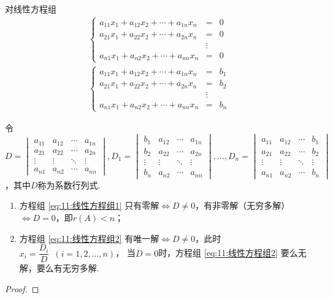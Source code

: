 \begin{theorem}  \label{thm:13:Cramer}
    对线性方程组
    \begin{gather}
        \label{eq:11:线性方程组1}
        \left\{ \begin{array}{rcl}
            a_{11}x_1+a_{12}x_2+\cdots+a_{1n}x_n&=&0 \\
            a_{21}x_1+a_{22}x_2+\cdots+a_{2n}x_n&=&0 \\
            &\vdots& \\
            a_{n1}x_1+a_{n2}x_2+\cdots+a_{nn}x_n&=&0
        \end{array} \right.
        \\
        \label{eq:11:线性方程组2}
        \left\{ \begin{array}{rcl}
            a_{11}x_1+a_{12}x_2+\cdots+a_{1n}x_n&=&b_1 \\
            a_{21}x_1+a_{22}x_2+\cdots+a_{2n}x_n&=&b_2 \\
            &\vdots& \\
            a_{n1}x_1+a_{n2}x_2+\cdots+a_{nn}x_n&=&b_n
        \end{array} \right.
    \end{gather}

    令$D=\begin{vmatrix}
        a_{11} & a_{12} & \cdots & a_{1n} \\
        a_{21} & a_{22} & \cdots & a_{2n} \\
        \vdots & \vdots & \ddots & \vdots \\
        a_{n1} & a_{n2} & \cdots & a_{nn}
    \end{vmatrix},D_1=\begin{vmatrix}
        b_1 & a_{12} & \cdots & a_{1n} \\
        b_2 & a_{22} & \cdots & a_{2n} \\
        \vdots & \vdots & \ddots & \vdots \\
        b_n & a_{n2} & \cdots & a_{nn}
    \end{vmatrix},\ldots,D_n=\begin{vmatrix}
        a_{11} & a_{12} & \cdots & b_1 \\
        a_{21} & a_{22} & \cdots & b_2 \\
        \vdots & \vdots & \ddots & \vdots \\
        a_{n1} & a_{n2} & \cdots & b_n
    \end{vmatrix}$，其中$D$称为系数行列式.
    \begin{enumerate}
        \item 方程组 \ref{eq:11:线性方程组1} 只有零解$\iff D \neq 0$，有非零解（无穷多解）$\iff D=0$，即$r(A)<n$；

        \item 方程组 \ref{eq:11:线性方程组2} 有唯一解$\iff D \neq 0$，此时$x_i=\dfrac{D_i}{D}\enspace(i=1,2,\ldots,n)$，
        当$D=0$时，方程组 \ref{eq:11:线性方程组2} 要么无解，要么有无穷多解.
    \end{enumerate}
\end{theorem}
\begin{proof}
    
\end{proof}

